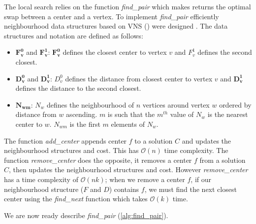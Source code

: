 The local search relies on the function \emph{find\_pair} which makes returns the optimal swap between a center and a vertex. To implement \emph{find\_pair} efficiently neighbourhood data structures based on VNS (\cite{mladenovic_solving_2003}) were designed . The data structures and notation are defined as follows:
\begin{itemize}
    \item $\mathbf{F^0_v}$ and $\mathbf{F^1_v}$: $\mathbf{F^0_v}$ defines the closest center to vertex $v$ and $F^1_v$ defines the second closest.
    \item $\mathbf{D^0_v}$ and $\mathbf{D^1_v}$: $D^0_v$ defines the distance from closest center to vertex $v$ and $\mathbf{D^1_v}$ defines the distance to the second closest.
    \item $\mathbf{N_{wm}}$: $N_w$ defines the neighbourhood of $n$ vertices around vertex $w$ ordered by distance from $w$ ascending. $m$ is such that the $m^{th}$ value of $N_w$ is the nearest center to $w$. $N_{wm}$ is the first $m$ elements of $N_w$.
\end{itemize}

The function \emph{add\_center} appends center $f$ to a solution $C$ and updates the neighbourhood structures and cost. This has $\mathcal{O}(n)$ time complexity. The function \emph{remove\_center} does the opposite, it removes a center $f$ from a solution $C$, then updates the neighbourhood structures and cost. However \emph{remove\_center} has a time complexity of $\mathcal{O}(nk)$; when we remove a center $f$, if our neighbourhood structure ($F$ and $D$) contains $f$, we must find the next closest center using the \emph{find\_next} function which takes $\mathcal{O}(k)$ time.

\begin{minipage}{0.48\textwidth}
    
\end{minipage}
\hspace{0.02\textwidth}
\begin{minipage}{0.48\textwidth}
    
\end{minipage}

We are now ready describe \emph{find\_pair} (\cref{alg:find_pair}). 



